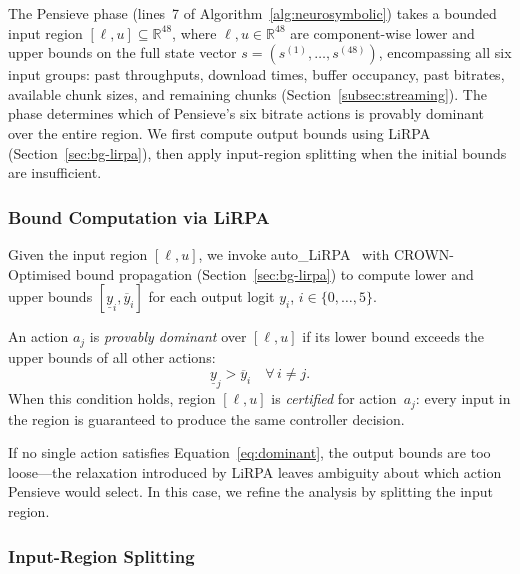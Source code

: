 \documentclass[thesis]{uofithesis} %
\begin{document}
    The Pensieve phase (lines~7 of
    Algorithm~\ref{alg:neurosymbolic}) takes a bounded input region
    $[\ell, u] \subseteq \mathbb{R}^{48}$, where
    $\ell, u \in \mathbb{R}^{48}$ are
    component-wise lower and upper bounds on the full state vector
    $s = (s^{(1)}, \ldots, s^{(48)})$, encompassing all six input groups:
    past throughputs, download times, buffer occupancy, past bitrates,
    available chunk sizes, and remaining chunks
    (Section~\ref{subsec:streaming}).  The phase determines which of
    Pensieve's six bitrate actions is provably dominant over the entire
    region.  We first compute output bounds using
    LiRPA (Section~\ref{sec:bg-lirpa}), then apply input-region splitting
    when the initial bounds are insufficient.


    \subsubsection{Bound Computation via LiRPA}
    \label{sec:verify-lirpa-usage}

    Given the input region $[\ell, u]$, we invoke
    auto\_LiRPA~\cite{auto-lirpa} with CROWN-Optimised bound
    propagation (Section~\ref{sec:bg-lirpa}) to compute lower and upper
    bounds $[\underline{y}_i, \overline{y}_i]$ for each output logit $y_i$,
    $i \in \{0, \ldots, 5\}$.

    An action $a_j$ is \emph{provably dominant} over $[\ell, u]$ if its
    lower bound exceeds the upper bounds of all other actions:
    \begin{equation}
        \underline{y}_j > \overline{y}_i
        \quad \forall\, i \neq j.
        \label{eq:dominant}
    \end{equation}
    When this condition holds, region $[\ell, u]$ is \emph{certified} for
    action~$a_j$: every input in the region is guaranteed to produce the
    same controller decision.

    If no single action satisfies Equation~\ref{eq:dominant}, the output
    bounds are too loose---the relaxation introduced by LiRPA leaves
    ambiguity about which action Pensieve would select.  In this case, we
    refine the analysis by splitting the input region.


    \subsubsection{Input-Region Splitting}
    \label{sec:verify-splitting}
\end{document}
